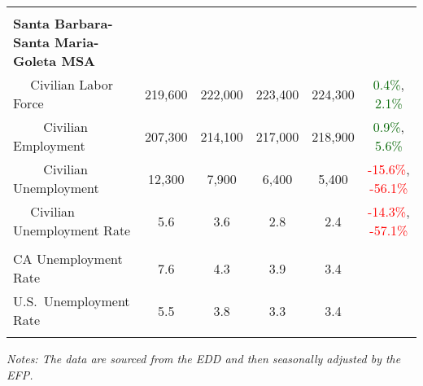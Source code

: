 \documentclass[12pt]{article}
\begin{document}
\begin{landscape}
\begin{table}
\begin{tabular}{|l|c|c|c|c|c|}
&&&&& \\
\textbf{Santa Barbara-Santa Maria-Goleta MSA} &&&&& \\
$\quad$ Civilian Labor Force &219,600 & 222,000 & 223,400 & 224,300 & \textcolor{darkgreen}{0.4\%}, \textcolor{darkgreen}{2.1\%} \\
$\qquad$ \small Civilian Employment &207,300 & 214,100 & 217,000 & 218,900 & \textcolor{darkgreen}{0.9\%}, \textcolor{darkgreen}{5.6\%} \\
$\qquad$ \small Civilian Unemployment &12,300 & 7,900 & 6,400 & 5,400 & \textcolor{red}{-15.6\%}, \textcolor{red}{-56.1\%} \\
$\quad$ Civilian Unemployment Rate &5.6 & 3.6 & 2.8 & 2.4 & \textcolor{red}{-14.3\%}, \textcolor{red}{-57.1\%} \\
&&&&& \\
CA Unemployment Rate & 7.6 & 4.3 & 3.9 & 3.4 & \\
U.S.\ Unemployment Rate & 5.5 & 3.8 & 3.3 & 3.4 & \\
& & & & & \\ \hline \hline
\end{tabular}
\par
\vspace{.5em}
\footnotesize
\textit{Notes: The data are sourced from the EDD and then seasonally adjusted by the EFP.}
\end{table}
\end{landscape}
\end{document}
